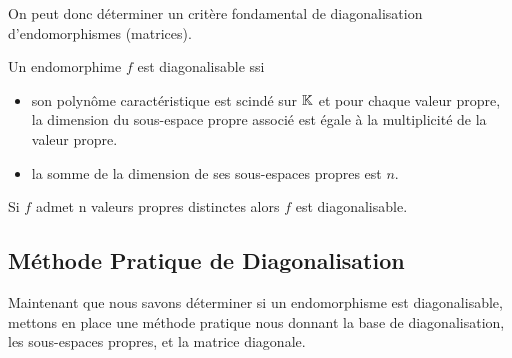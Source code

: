 On peut donc déterminer un critère fondamental de diagonalisation d'endomorphismes (matrices). 

\begin{criteria}
    Un endomorphime $f$ est diagonalisable ssi 
    \begin{itemize}
        \item son polynôme caractéristique est scindé sur $\mathbb{K}$ et pour chaque valeur propre, 
        la dimension du sous-espace propre associé est égale à la multiplicité de la valeur propre. 
        \item la somme de la dimension de ses sous-espaces propres est $n$. 
    \end{itemize}
\end{criteria}

\begin{corollary}
    Si $f$ admet n valeurs propres distinctes alors $f$ est diagonalisable. 
\end{corollary}


\subsection{Méthode Pratique de Diagonalisation}

Maintenant que nous savons déterminer si un endomorphisme est diagonalisable, mettons en place 
une méthode pratique nous donnant la base de diagonalisation, les sous-espaces propres, et la matrice diagonale. 

